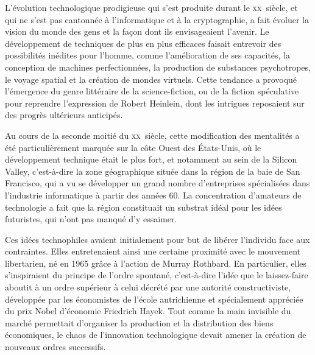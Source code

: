 L'évolution technologique prodigieuse qui s'est produite durant le \textsc{xx}\ieme{}~siècle, et qui ne s'est pas cantonnée à l'informatique et à la cryptographie, a fait évoluer la vision du monde des gens et la façon dont ils envisageaient l'avenir. Le développement de techniques de plus en plus efficaces faisait entrevoir des possibilités inédites pour l'homme, comme l'amélioration de ses capacités, la conception de machines perfectionnées, la production de substances psychotropes, le voyage spatial et la création de mondes virtuels. Cette tendance a provoqué l'émergence du genre littéraire de la science-fiction, ou de la fiction spéculative pour reprendre l'expression de Robert Heinlein, dont les intrigues reposaient sur des progrès ultérieurs anticipés.


Au cours de la seconde moitié du \textsc{xx}\ieme{}~siècle, cette modification des mentalités a été particulièrement marquée sur la côte Ouest des États-Unis, où le développement technique était le plus fort, et notamment au sein de la Silicon Valley, c'est-à-dire la zone géographique située dans la région de la baie de San Francisco, qui a vu se développer un grand nombre d'entreprises spécialisées dans l'industrie informatique à partir des années 60. La concentration d'amateurs de technologie a fait que la région constituait un substrat idéal pour les idées futuristes, qui n'ont pas manqué d'y essaimer.

Ces idées technophiles avaient initialement pour but de libérer l'individu face aux contraintes. Elles entretenaient ainsi une certaine proximité avec le mouvement libertarien, né en 1965 grâce à l'action de Murray Rothbard. En particulier, elles s'inspiraient du principe de l'ordre spontané, c'est-à-dire l'idée que le laissez-faire aboutit à un ordre supérieur à celui décrété par une autorité constructiviste, développée par les économistes de l'école autrichienne et spécialement appréciée du prix Nobel d'économie Friedrich Hayek. Tout comme la main invisible du marché permettait d'organiser la production et la distribution des biens économiques, le chaos de l'innovation technologique devait amener la création de nouveaux ordres successifs.

